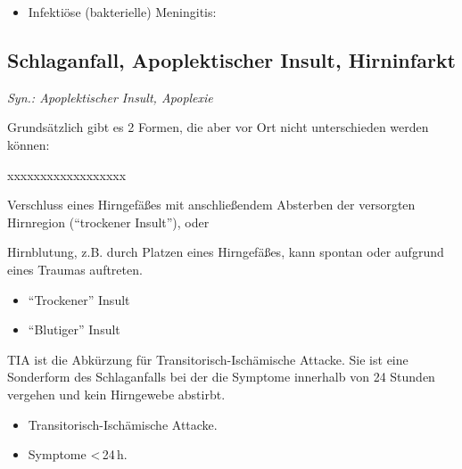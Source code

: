 
\begin{itemize}
  \item Infektiöse (bakterielle) Meningitis:
\end{itemize}


\subsection{Schlaganfall, Apoplektischer Insult, Hirninfarkt}
\label{topic:tia}

\emph{Syn.: Apoplektischer Insult, Apoplexie}


{
Grundsätzlich gibt es 2 Formen, die aber vor Ort nicht
unterschieden werden können:
\begin{labeling}[~--]{xxxxxxxxxxxxxxxxxx}
  \item[\T{Trockener Insult}] Verschluss eines Hirngefäßes mit anschließendem
  Absterben der versorgten Hirnregion ("`trockener
  Insult"'), oder
  \item[\T{Blutiger Insult}] Hirnblutung, z.B. durch Platzen eines
  Hirngefäßes, kann spontan oder aufgrund eines Traumas auftreten.
\end{labeling}

}
{
\begin{itemize}
  \item "`Trockener"' Insult
  \item "`Blutiger"' Insult
\end{itemize}

}{}{}{}

{
TIA ist die Abkürzung für Transitorisch-Ischämische Attacke. Sie ist eine Sonderform des
Schlaganfalls bei der die Symptome innerhalb von 24 Stunden vergehen und kein
Hirngewebe abstirbt.
}
{
\begin{itemize}
  \item Transitorisch-Ischämische Attacke.
  \item Symptome <\,24\,h.
\end{itemize}

}{}{}{}



